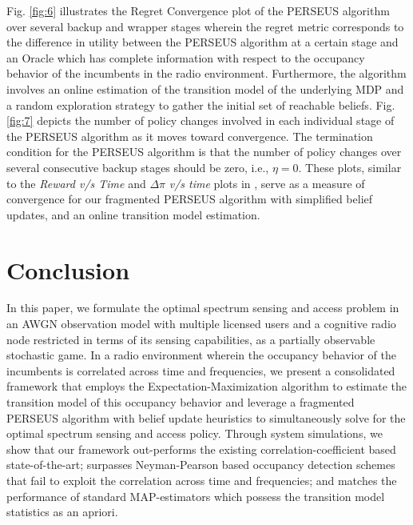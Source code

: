 \documentclass[10pt,twocolumn]{IEEEtran}
\begin{document}
Fig. \ref{fig:6} illustrates the Regret Convergence plot of the PERSEUS algorithm over several backup and wrapper stages wherein the regret metric corresponds to the difference in utility between the PERSEUS algorithm at a certain stage and an Oracle which has complete information with respect to the occupancy behavior of the incumbents in the radio environment. Furthermore, the algorithm involves an online estimation of the transition model of the underlying MDP and a random exploration strategy to gather the initial set of reachable beliefs. Fig. \ref{fig:7} depicts the number of policy changes involved in each individual stage of the PERSEUS algorithm as it moves toward convergence. The termination condition for the PERSEUS algorithm is that the number of policy changes over several consecutive backup stages should be zero, i.e., $\eta = 0$. These plots, similar to the \textit{Reward v/s Time} and $\Delta \pi$ \textit{v/s time} plots in \cite{DBLP:journals/corr/abs-1109-2145}, serve as a measure of convergence for our fragmented PERSEUS algorithm with simplified belief updates, and an online transition model estimation.
\section{Conclusion}\label{V}
In this paper, we formulate the optimal spectrum sensing and access problem in an AWGN observation model with multiple licensed users and a cognitive radio node restricted in terms of its sensing capabilities, as a partially observable stochastic game. In a radio environment wherein the occupancy behavior of the incumbents is correlated across time and frequencies, we present a consolidated framework that employs the Expectation-Maximization algorithm to estimate the transition model of this occupancy behavior and leverage a fragmented PERSEUS algorithm with belief update heuristics to simultaneously solve for the optimal spectrum sensing and access policy. Through system simulations, we show that our framework out-performs the existing correlation-coefficient based state-of-the-art; surpasses Neyman-Pearson based occupancy detection schemes that fail to exploit the correlation across time and frequencies; and matches the performance of standard MAP-estimators which possess the transition model statistics as an apriori.


\end{document}

